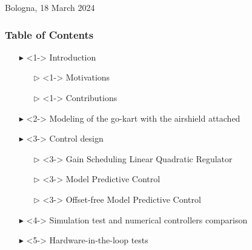 \documentclass[11pt, aspectratio=169]{beamer}
\begin{document}
\begin{frame}

\vspace{0.5cm}
\begin{center}
\scriptsize
  \textcolor{emph@Thesis}{Bologna, 18 March 2024}
\end{center}


\end{frame}


\begin{frame}
\frametitle{Table of Contents}
\begin{itemize}
	\item[$\blacktriangleright$]<1-> Introduction
		\begin{itemize}
			\small
			\item[$\triangleright$]<1-> Motivations
			\item[$\triangleright$]<1-> Contributions
		\end{itemize}
	\item[$\blacktriangleright$]<2-> Modeling of the go-kart with the airshield attached
	\item[$\blacktriangleright$]<3-> Control design
		\begin{itemize}
		\small
			\item[$\triangleright$]<3-> Gain Scheduling Linear Quadratic Regulator
			\item[$\triangleright$]<3-> Model Predictive Control
			\item[$\triangleright$]<3-> Offset-free Model Predictive Control
		\end{itemize}
	\item[$\blacktriangleright$]<4-> Simulation test and numerical controllers comparison
	\item[$\blacktriangleright$]<5-> Hardware-in-the-loop tests
\end{itemize}
\end{frame}
\end{document}
